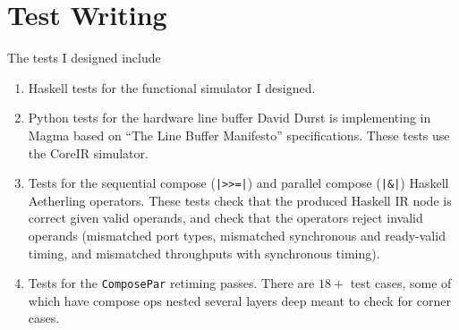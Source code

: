 \documentclass[12pt]{article}
\begin{document}
\section{Test Writing}

The tests I designed include
\begin{enumerate}
\item

Haskell tests for the functional simulator I designed.

\item

Python tests for the hardware line buffer David Durst is
implementing in Magma based on ``The Line Buffer Manifesto''
specifications. These tests use the CoreIR simulator.

\item

Tests for the sequential compose (\texttt{|>>=|}) and parallel
compose (\texttt{|\&|}) Haskell Aetherling operators. These tests
check that the produced Haskell IR node is correct given valid
operands, and check that the operators reject invalid operands
(mismatched port types, mismatched synchronous and ready-valid
timing, and mismatched throughputs with synchronous timing).

\item Tests for the \texttt{ComposePar} retiming passes. There are
$18+$ test cases, some of which have compose ops nested several
layers deep meant to check for corner cases.
\end{enumerate}
\end{document}
